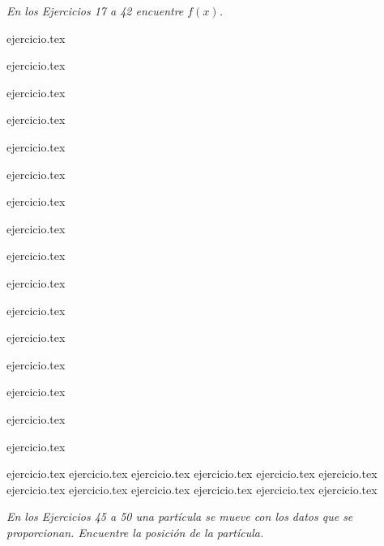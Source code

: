 \vspace{1em}
\noindent \textit{En los Ejercicios 17 a 42 encuentre $f(x)$.}

\begin{enumerate}
    \setcounter{enumi}{16}
    \begin{minipage}{0.45\textwidth}
    {ejercicio.tex}
    \addtocounter{enumi}{1}
    {ejercicio.tex}
    \addtocounter{enumi}{1}
    {ejercicio.tex}
    \addtocounter{enumi}{1}
    {ejercicio.tex}
    \addtocounter{enumi}{1}
    {ejercicio.tex}
    \addtocounter{enumi}{1}
    {ejercicio.tex}
    \addtocounter{enumi}{1}
    {ejercicio.tex}
    \addtocounter{enumi}{1}
    {ejercicio.tex}
    \end{minipage}%
    \begin{minipage}{0.45\textwidth}
    \setcounter{enumi}{17}
    {ejercicio.tex}
    \addtocounter{enumi}{1}
    {ejercicio.tex}
    \addtocounter{enumi}{1}
    {ejercicio.tex}
    \addtocounter{enumi}{1}
    {ejercicio.tex}
    \addtocounter{enumi}{1}
    {ejercicio.tex}
    \addtocounter{enumi}{1}
    {ejercicio.tex}
    \addtocounter{enumi}{1}
    {ejercicio.tex}
    \addtocounter{enumi}{1}
    {ejercicio.tex}
    \end{minipage}
\end{enumerate}

\vspace{1em}
\begin{enumerate}
    \setcounter{enumi}{32}
    {ejercicio.tex}
    {ejercicio.tex}
    {ejercicio.tex}
    {ejercicio.tex}
    {ejercicio.tex}
    {ejercicio.tex}
    {ejercicio.tex}
    {ejercicio.tex}
    {ejercicio.tex}
    {ejercicio.tex}
    {ejercicio.tex}
    {ejercicio.tex}
\end{enumerate}

\vspace{1em}
\noindent \textit{En los Ejercicios 45 a 50 una partícula se mueve con los datos que se proporcionan. Encuentre la posición de la partícula.}

